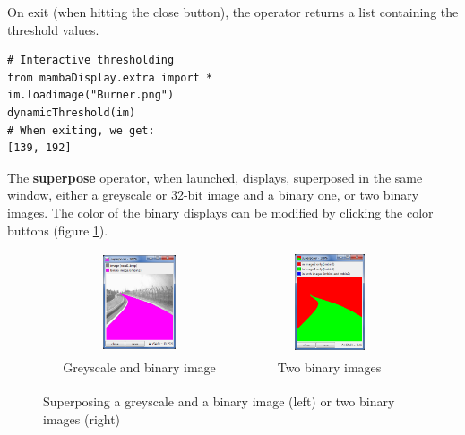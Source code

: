 \documentclass[a4paper,10pt,oneside]{article}
\begin{document}
On exit (when hitting the close button), the operator returns a list containing the
threshold values.

\lstset{language=Python}
\begin{lstlisting}
# Interactive thresholding
from mambaDisplay.extra import *
im.loadimage("Burner.png")
dynamicThreshold(im)
# When exiting, we get:
[139, 192]
\end{lstlisting}

The \textbf{superpose} operator, when launched, displays, superposed in the same window, either
a greyscale or 32-bit image and a binary one, or two binary images. The color of the
binary displays can be modified by clicking the color buttons (figure \ref{fig:superpose}). 

\begin{figure}
\centering
\begin{tabular}{cc}
\includegraphics[width=0.4\textwidth]{images/superposer.png} & 
\includegraphics[width=0.4\textwidth]{images/binsuperposer.png} \\ 
Greyscale and binary image &
Two binary images \\ 
\end{tabular}
\caption{Superposing a greyscale and a binary image (left) or two binary images (right)}
\label{fig:superpose}
\end{figure}
\end{document}
